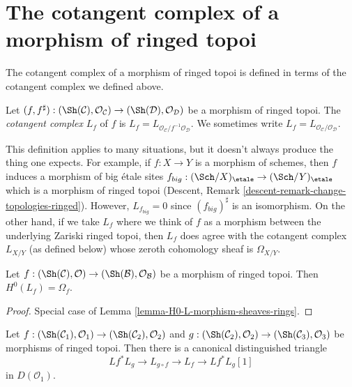 \section{The cotangent complex of a morphism of ringed topoi}
\label{section-cotangent-morphism-ringed-topoi}

\noindent
The cotangent complex of a morphism of ringed topoi is defined
in terms of the cotangent complex we defined above.

\begin{definition}
\label{definition-cotangent-complex-morphism-ringed-topoi}
Let $(f, f^\sharp) : (\Sh(\mathcal{C}), \mathcal{O}_\mathcal{C}) \to
(\Sh(\mathcal{D}), \mathcal{O}_\mathcal{D})$ be a morphism of ringed topoi.
The {\it cotangent complex} $L_f$ of $f$ is
$L_f = L_{\mathcal{O}_\mathcal{C}/f^{-1}\mathcal{O}_\mathcal{D}}$.
We sometimes write $L_f = L_{\mathcal{O}_\mathcal{C}/\mathcal{O}_\mathcal{D}}$.
\end{definition}

\noindent
This definition applies to many situations, but it doesn't always produce
the thing one expects. For example, if $f : X \to Y$ is a morphism of
schemes, then $f$ induces a morphism of big \'etale sites
$f_{big} : (\Sch/X)_\etale \to (\Sch/Y)_\etale$
which is a morphism of ringed topoi (Descent, Remark
\ref{descent-remark-change-topologies-ringed}).
However, $L_{f_{big}} = 0$ since $(f_{big})^\sharp$ is an isomorphism.
On the other hand, if we take $L_f$ where we think of $f$ as a morphism
between the underlying Zariski ringed topoi, then $L_f$ does agree with
the cotangent complex $L_{X/Y}$ (as defined below)
whose zeroth cohomology sheaf is $\Omega_{X/Y}$.

\begin{lemma}
\label{lemma-H0-L-morphism-ringed-topoi}
Let $f : (\Sh(\mathcal{C}), \mathcal{O}) \to
(\Sh(\mathcal{B}), \mathcal{O}_\mathcal{B})$ be a morphism of
ringed topoi. Then $H^0(L_f) = \Omega_f$.
\end{lemma}

\begin{proof}
Special case of Lemma \ref{lemma-H0-L-morphism-sheaves-rings}.
\end{proof}

\begin{lemma}
\label{lemma-triangle-ringed-topoi}
Let $f : (\Sh(\mathcal{C}_1), \mathcal{O}_1) \to
(\Sh(\mathcal{C}_2), \mathcal{O}_2)$ and
$g : (\Sh(\mathcal{C}_2), \mathcal{O}_2) \to
(\Sh(\mathcal{C}_3), \mathcal{O}_3)$ be morphisms of ringed topoi.
Then there is a canonical distinguished triangle
$$
Lf^* L_g \to L_{g \circ f} \to L_f \to Lf^*L_g[1]
$$
in $D(\mathcal{O}_1)$.
\end{lemma}

